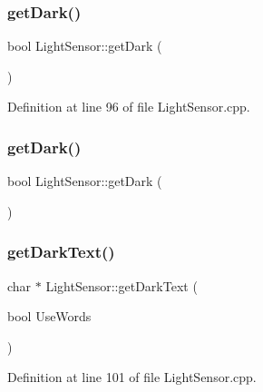\subsubsection{\texorpdfstring{get\+Dark()}{getDark()}\hspace{0.1cm}{\footnotesize\ttfamily [1/2]}}
{\footnotesize\ttfamily bool Light\+Sensor\+::get\+Dark (\begin{DoxyParamCaption}{ }\end{DoxyParamCaption})}



Definition at line 96 of file Light\+Sensor.\+cpp.

\mbox{\label{class_light_sensor_a06881cb787b1968daf4d1a49923617fe}} 
\subsubsection{\texorpdfstring{get\+Dark()}{getDark()}\hspace{0.1cm}{\footnotesize\ttfamily [2/2]}}
{\footnotesize\ttfamily bool Light\+Sensor\+::get\+Dark (\begin{DoxyParamCaption}{ }\end{DoxyParamCaption})}

\mbox{\label{class_light_sensor_a70fd8f7252cbc9abb2ea501ccfaf08fe}} 
\subsubsection{\texorpdfstring{get\+Dark\+Text()}{getDarkText()}\hspace{0.1cm}{\footnotesize\ttfamily [1/2]}}
{\footnotesize\ttfamily char $\ast$ Light\+Sensor\+::get\+Dark\+Text (\begin{DoxyParamCaption}\item[{bool}]{Use\+Words }\end{DoxyParamCaption})}



Definition at line 101 of file Light\+Sensor.\+cpp.

